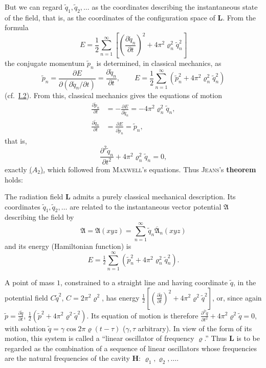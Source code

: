 \documentclass[fontsize=13pt,twoside,openany,headings=normal,parskip=false,bookmarkpackage=false,DIV=calc]{scrbook}
\begin{document}
But we can regard $\widetilde q_1,\widetilde q_2,\ldots$ as the coordinates describing the instantaneous state of the field, that is, as the coordinates of the configuration space of $\boldsymbol{L}$.
\hypertarget{origpage-139}{}%
From the formula
\[
 E=\frac12\sum_{n=1}^{\infty}
 \left[\left(\frac{\partial\widetilde q_n}{\partial t}\right)^2
 +4\pi^2\varrho_n^2\widetilde q_n^2\right]
\]
the conjugate momentum $\widetilde p_n$ is determined, in classical mechanics, as
\[
 \widetilde p_n=\frac{\partial E}{\partial(\partial\widetilde q_n/\partial t)}
 =\frac{\partial\widetilde q_n}{\partial t},\qquad
 E=\frac12\sum_{n=1}^{\infty}(\widetilde p_n^2+4\pi^2\varrho_n^2\widetilde q_n^2)
\]
(cf.\ \hyperref[sec:I.2]{I.2}). From this, classical mechanics gives the equations of motion
\begin{align*}
 \frac{\partial\widetilde p_n}{\partial t}
 &=-\frac{\partial E}{\partial\widetilde q_n}=-4\pi^2\varrho_n^2\widetilde q_n,\\
 \frac{\partial\widetilde q_n}{\partial t}
 &=\frac{\partial E}{\partial\widetilde p_n}=\widetilde p_n,
\end{align*}
that is,
\[
 \frac{\partial^2\widetilde q_n}{\partial t^2}+4\pi^2\varrho_n^2\widetilde q_n=0,
\]
exactly \hyperref[eq:III.6.A2]{($A_2$)}, which followed from \textsc{Maxwell}'s equations. Thus \textsc{Jeans}'s \textbf{theorem} holds:

The radiation field $\boldsymbol{L}$ admits a purely classical mechanical description. Its coordinates $\widetilde q_1,\widetilde q_2,\ldots$ are related to the instantaneous vector potential $\mathfrak A$ describing the field by
\[
 \mathfrak A=\mathfrak A(xyz)=\sum_{n=1}^{\infty}\widetilde q_n\overline{\mathfrak A}_n(xyz)
\]
and its energy (Hamiltonian function) is
\[
 E=\tfrac12\sum_{n=1}^{\infty}(\widetilde p_n^2+4\pi^2\varrho_n^2\widetilde q_n^2).
\]

A point of mass $1$, constrained to a straight line and having coordinate $\widetilde q$, in the potential field $C\widetilde q^2$, $C=2\pi^2\varrho^2$, has energy $\frac12[(\frac{\partial\widetilde q}{\partial t})^2+4\pi^2\varrho^2\widetilde q^2]$, or, since again $\widetilde p=\frac{\partial\widetilde q}{\partial t}$, $\frac12(\widetilde p^2+4\pi^2\varrho^2\widetilde q^2)$. Its equation of motion is therefore $\frac{\partial^2\widetilde q}{\partial t^2}+4\pi^2\varrho^2\widetilde q=0$, with solution $\widetilde q=\gamma\cos2\pi\varrho(t-\tau)$ ($\gamma,\tau$ arbitrary). In view of the form of its motion, this system is called a ``linear oscillator of frequency $\varrho$.'' Thus $\boldsymbol{L}$ is to be regarded as the combination of a sequence of linear oscillators whose frequencies are the natural frequencies of the cavity $\boldsymbol H$: $\varrho_1,\varrho_2,\ldots$.
\end{document}
